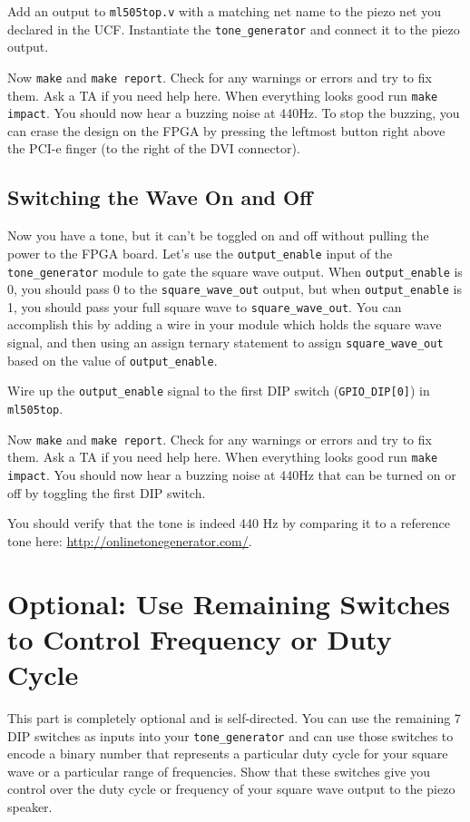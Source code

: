\documentclass[11pt]{article}
\begin{document}
Add an output to \verb|ml505top.v| with a matching net name to the piezo net you declared in the UCF. Instantiate the \verb|tone_generator| and connect it to the piezo output.

Now \verb|make| and \verb|make report|. Check for any warnings or errors and try to fix them. Ask a TA if you need help here. When everything looks good run \verb|make impact|. You should now hear a buzzing noise at 440Hz. To stop the buzzing, you can erase the design on the FPGA by pressing the leftmost button right above the PCI-e finger (to the right of the DVI connector).

\subsection{Switching the Wave On and Off}
Now you have a tone, but it can't be toggled on and off without pulling the power to the FPGA board. Let's use the \verb|output_enable| input of the \verb|tone_generator| module to gate the square wave output. When \verb|output_enable| is 0, you should pass 0 to the \verb|square_wave_out| output, but when \verb|output_enable| is 1, you should pass your full square wave to \verb|square_wave_out|. You can accomplish this by adding a wire in your module which holds the square wave signal, and then using an assign ternary statement to assign \verb|square_wave_out| based on the value of \verb|output_enable|.

Wire up the \verb|output_enable| signal to the first DIP switch (\verb|GPIO_DIP[0]|) in \verb|ml505top|.

Now \verb|make| and \verb|make report|. Check for any warnings or errors and try to fix them. Ask a TA if you need help here. When everything looks good run \verb|make impact|. You should now hear a buzzing noise at 440Hz that can be turned on or off by toggling the first DIP switch.

You should verify that the tone is indeed 440 Hz by comparing it to a reference tone here: \url{http://onlinetonegenerator.com/}.

\section{Optional: Use Remaining Switches to Control Frequency or Duty Cycle}
This part is completely optional and is self-directed. You can use the remaining 7 DIP switches as inputs into your \verb|tone_generator| and can use those switches to encode a binary number that represents a particular duty cycle for your square wave or a particular range of frequencies. Show that these switches give you control over the duty cycle or frequency of your square wave output to the piezo speaker.
\end{document}
